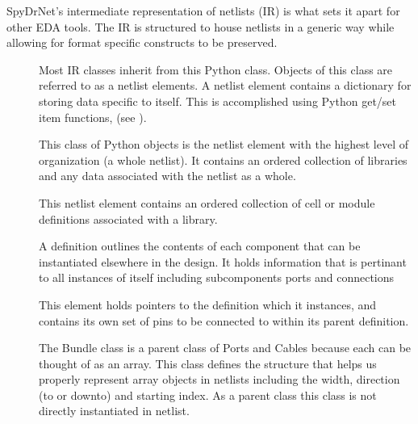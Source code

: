 \documentclass[letterpaper,10pt,english,openany,oneside]{sphinxmanual}
\begin{document}
SpyDrNet’s intermediate representation of netlists (IR) is what sets it apart for other EDA tools. The IR is structured to house netlists in a generic way while allowing for format specific constructs to be preserved.
\begin{description}
\item[{}] \leavevmode
Most IR classes inherit from this Python class. Objects of this class are referred to as a netlist elements. A netlist
element contains a dictionary for storing data specific to itself. This is accomplished using Python get/set item
functions, (see {\hyperref[\detokenize{reference/element_data:sec-element-data}]{}}).

\item[{{\hyperref[\detokenize{reference/classes/netlist:spydrnet.Netlist}]{}}}] \leavevmode
This class of Python objects is the netlist element with the highest level of organization (a whole netlist). It
contains an ordered collection of libraries and any data associated with the netlist as a whole.

\item[{{\hyperref[\detokenize{reference/classes/library:spydrnet.Library}]{}}}] \leavevmode
This netlist element contains an ordered collection of cell or module definitions associated with a library.

\item[{{\hyperref[\detokenize{reference/classes/definition:spydrnet.Definition}]{}}}] \leavevmode
A definition outlines the contents of each component that can be instantiated elsewhere in the design. It holds information that is pertinant to all instances of itself including subcomponents ports and connections

\item[{{\hyperref[\detokenize{reference/classes/instance:spydrnet.Instance}]{}}}] \leavevmode
This element holds pointers to the definition which it instances, and contains its own set of pins to be connected to within its parent definition.

\item[{}] \leavevmode
The Bundle class is a parent class of Ports and Cables because each can be thought of as an array. This class defines the structure that helps us properly represent array objects in netlists including the width, direction (to or downto) and starting index. As a parent class this class is not directly instantiated in netlist.


\end{description}
\end{document}
